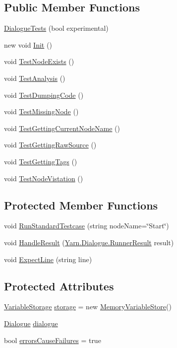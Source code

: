 \subsection*{Public Member Functions}
\begin{DoxyCompactItemize}
\item 
\hyperlink{a00096_a4c826102af9c6b062138d72b24e7a37b}{Dialogue\-Tests} (bool experimental)
\item 
new void \hyperlink{a00096_a49813a64c710540348c15365a672e675}{Init} ()
\item 
void \hyperlink{a00096_a9d4171827bf3eba4c6ae52760a475f45}{Test\-Node\-Exists} ()
\item 
void \hyperlink{a00096_a40b0efb3cac1715b44640c29988139f1}{Test\-Analysis} ()
\item 
void \hyperlink{a00096_a111f0f8418baaeaf83cfb422c90210e0}{Test\-Dumping\-Code} ()
\item 
void \hyperlink{a00096_a013d5e3847b9d716b39aa925d70b99fd}{Test\-Missing\-Node} ()
\item 
void \hyperlink{a00096_afbb342ea64e33ee19d42a6a2c949592a}{Test\-Getting\-Current\-Node\-Name} ()
\item 
void \hyperlink{a00096_a16ed34de323da529e1a17670f556791c}{Test\-Getting\-Raw\-Source} ()
\item 
void \hyperlink{a00096_abb7bc5876ca4f37e93c6ac40bbd0e3b7}{Test\-Getting\-Tags} ()
\item 
void \hyperlink{a00096_a9c0d2732044b273929dbce35358a1906}{Test\-Node\-Vistation} ()
\end{DoxyCompactItemize}
\subsection*{Protected Member Functions}
\begin{DoxyCompactItemize}
\item 
void \hyperlink{a00172_abffa134d40d72b21e6b35c3bf05fc53f}{Run\-Standard\-Testcase} (string node\-Name=\char`\"{}Start\char`\"{})
\item 
void \hyperlink{a00172_a7b525f85a26d7c942e1cbfa5d6453893}{Handle\-Result} (\hyperlink{a00158}{Yarn.\-Dialogue.\-Runner\-Result} result)
\item 
void \hyperlink{a00172_ac21a5082ddac1da9db17ae54038df44e}{Expect\-Line} (string line)
\end{DoxyCompactItemize}
\subsection*{Protected Attributes}
\begin{DoxyCompactItemize}
\item 
\hyperlink{a00192}{Variable\-Storage} \hyperlink{a00172_a23d59ace1516ca72924c6fe3feafd3f7}{storage} = new \hyperlink{a00138}{Memory\-Variable\-Store}()
\item 
\hyperlink{a00094}{Dialogue} \hyperlink{a00172_a4cff5de56c4b8a91c76b6eb2d622a795}{dialogue}
\item 
bool \hyperlink{a00172_ac978fe85db843c51411f5517bdbe0eb8}{errors\-Cause\-Failures} = true
\end{DoxyCompactItemize}
